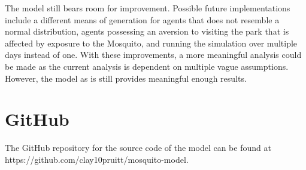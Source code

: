 \documentclass[twocolumn,11pt]{article}
\begin{document}
The model still bears room for improvement. Possible future implementations include a different means of generation for agents that does not resemble a normal distribution, agents possessing an aversion to visiting the park that is affected by exposure to the Mosquito, and running the simulation over multiple days instead of one. With these improvements, a more meaningful analysis could be made as the current analysis is dependent on multiple vague assumptions. However, the model as is still provides meaningful enough results.




\appendix
\appendixpage
\section{GitHub}
The GitHub repository for the source code of the model can be found at https://github.com/clay10pruitt/mosquito-model.
\end{document}
